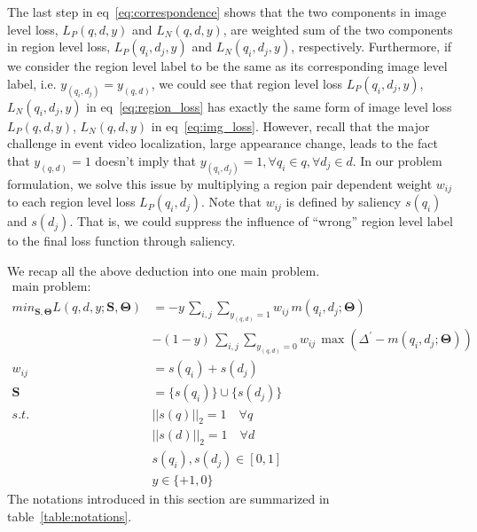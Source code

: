 The last step in eq~\eqref{eq:correspondence} shows that the two components in image level loss, $L_P(q, d, y)$ and $L_N(q, d, y)$, are weighted sum of the two components in region level loss, $L_P(q_i, d_j, y)$ and $L_N(q_i, d_j, y)$, respectively. 
Furthermore, if we consider the region level label to be the same as its corresponding image level label, i.e. $y_{(q_i, d_j)} = y_{(q, d)}$, we could see that region level loss $L_P(q_i, d_j, y)$, $L_N(q_i, d_j, y)$ in eq~\eqref{eq:region_loss} has exactly the same form of image level loss $L_P(q, d, y)$, $L_N(q, d, y)$ in eq~\eqref{eq:img_loss}. 
However, recall that the major challenge in event video localization, large appearance change, leads to the fact that $y_{(q,d)} = 1$ doesn't imply that $y_{(q_i, d_j)} = 1, \forall q_i \in q, \forall d_j \in d$. 
In our problem formulation, we solve this issue by multiplying a region pair dependent weight $w_{ij}$ to each region level loss $L_P(q_i, d_j)$. 
Note that $w_{ij}$ is defined by saliency $s(q_i)$ and $s(d_j)$. 
That is, we could suppress the influence of ``wrong'' region level label to the final loss function through saliency. 

We recap all the above deduction into one main problem. 
\begin{equation*}
\begin{aligned}
\text{main problem:}\\
min_{\mathbf{S}, \mathbf{\Theta}} L(q, d, y; \mathbf{S}, \mathbf{\Theta}) &= -y\, \sum_{i, j}\sum_{y_{(q, d)}=1} w_{ij}\, m(q_i, d_j; \mathbf{\Theta}) \\
& - (1-y)\, \sum_{i, j}\sum_{y_{(q, d)}=0} w_{ij}\, \max(\Delta^{'}-m(q_i, d_j; \mathbf{\Theta}))\\
w_{ij} &= s(q_i) + s(d_j)\\
\mathbf{S} &= \{s(q_i)\} \cup \{s(d_j)\}\\  
s.t. & ||s(q)||_2 = 1 \quad \forall q\\
& ||s(d)||_2 = 1 \quad \forall d\\
& s(q_i), s(d_j) \in [0,1] \\
& y\in \{+1, 0\}
\end{aligned}
\end{equation*}
The notations introduced in this section are summarized in table~\ref{table:notations}. 

